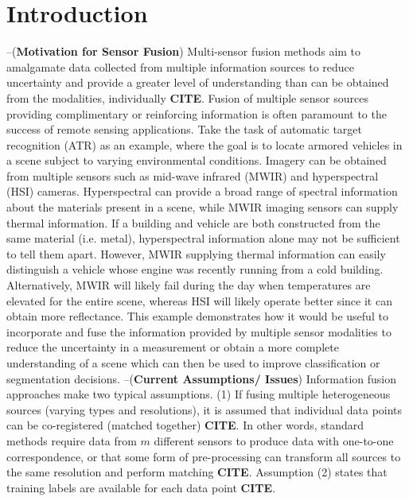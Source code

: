 \chapter{Introduction}
\vspace{1cm}\noindent --(\textbf{Motivation for Sensor Fusion}) \newline
Multi-sensor fusion methods aim to amalgamate data collected from multiple information sources to reduce uncertainty and provide a greater level of understanding than can be obtained from the modalities, individually \textbf{CITE}.  Fusion of multiple sensor sources providing complimentary or reinforcing information is often paramount to the success of remote sensing applications.  Take the task of automatic target recognition (ATR) as an example, where the goal is to locate armored vehicles in a scene subject to varying environmental conditions.  Imagery can be obtained from multiple sensors such as mid-wave infrared (MWIR) and hyperspectral (HSI) cameras.  Hyperspectral can provide a broad range of spectral information about the materials present in a scene, while MWIR imaging sensors can supply thermal information.  If a building and vehicle are both constructed from the same material (i.e. metal), hyperspectral information alone may not be sufficient to tell them apart.  However, MWIR supplying thermal information can easily distinguish a vehicle whose engine was recently running from a cold building.  Alternatively, MWIR will likely fail during the day when temperatures are elevated for the entire scene, whereas HSI will likely operate better since it can obtain more reflectance.  This example demonstrates how it would be useful to incorporate and fuse the information provided by multiple sensor modalities to reduce the uncertainty in a measurement or obtain a more complete understanding of a scene which can then be used to improve classification or segmentation decisions.
\newline
\vspace{1cm}\noindent --(\textbf{Current Assumptions/ Issues}) \newline
Information fusion approaches make two typical assumptions. (1) If fusing multiple heterogeneous sources (varying types and resolutions), it is assumed that individual data points can be co-registered (matched together) \textbf{CITE}. In other words, standard methods require data from $m$ different sensors to produce data with one-to-one correspondence, or that some form of pre-processing can transform all sources to the same resolution and perform matching \textbf{CITE}.  Assumption (2) states that training labels are available for each data point \textbf{CITE}. 
